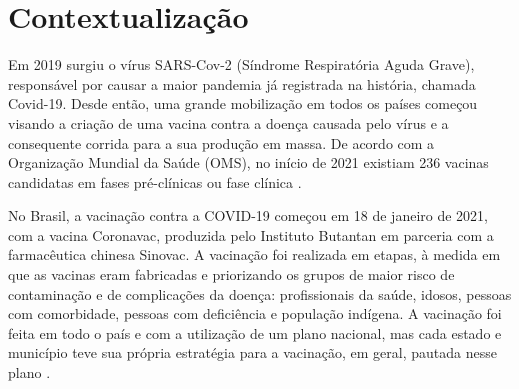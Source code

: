 
\label{Cap:Introducao}





\section{Contextualização}
\label{cap1:Sec:Contextualizacao}
Em 2019 surgiu o vírus SARS-Cov-2 (Síndrome Respiratória Aguda Grave), responsável por causar a maior pandemia já registrada na história, chamada Covid-19. Desde então, uma grande mobilização em todos os países começou visando a criação de uma vacina contra a doença causada pelo vírus e a consequente corrida para a sua produção em massa. De acordo com a Organização Mundial da Saúde (OMS), no início de 2021 existiam 236 vacinas candidatas em fases pré-clínicas ou fase clínica \cite{ministerio2022plano}.


No Brasil, a vacinação contra a COVID-19 começou em 18 de janeiro de 2021, com a vacina Coronavac, produzida pelo Instituto Butantan em parceria com a farmacêutica chinesa Sinovac. A vacinação foi realizada em etapas, à medida em que as vacinas eram fabricadas e priorizando os grupos de maior risco de contaminação e de complicações da doença: profissionais da saúde, idosos, pessoas com comorbidade, pessoas com deficiência e população indígena. A vacinação foi feita em todo o país e com a utilização de um plano nacional, mas cada estado e município teve sua própria estratégia para a vacinação, em geral, pautada nesse plano \cite{ministerio2022plano}.



